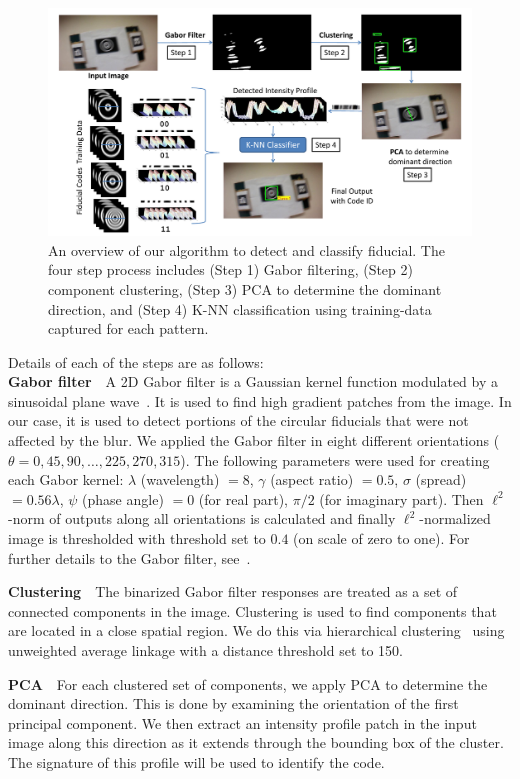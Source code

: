 \documentclass[10pt,twocolumn,letterpaper]{article}
\begin{document}
\begin{figure}[ht!]
\centering
\includegraphics[width=0.8\linewidth]{overall_flow.pdf}
\caption{An overview of our algorithm to detect and classify fiducial.
The four step process includes (Step 1) Gabor filtering,
(Step 2) component clustering, (Step 3) PCA to determine the dominant direction,
and (Step 4) K-NN classification using training-data captured for each pattern.}
\label{fig:overall_flow}
\end{figure}

\noindent Details of each of the steps are as follows:\\
\noindent\textbf{Gabor filter}~~A 2D Gabor filter is a Gaussian kernel function
modulated by a sinusoidal plane wave~\cite{Kruizinga:2002}. It is used to find
high gradient patches from the image. In our case, it is used to detect portions
of the circular fiducials that were not affected by the blur.
We applied the Gabor filter in eight
different orientations ($\theta = 0, 45, 90, \ldots ,225, 270, 315$).  The
following parameters were used for creating each Gabor kernel: $\lambda$ (wavelength) $= 8$, $\gamma$
(aspect ratio) $= 0.5$, $\sigma$ (spread) $= 0.56\lambda$, $\psi$
(phase angle) $= 0$ (for real part), $\pi/2$ (for imaginary part).
Then $\ell^2$-norm of outputs along all orientations is calculated and finally
$\ell^2$-normalized image is thresholded with threshold set to $0.4$ (on scale of zero to
one).  For further details to the Gabor filter, see~\cite{Kruizinga:2002}.

\noindent\textbf{Clustering}~~The binarized Gabor filter responses are
treated as a set of connected components in the image.   Clustering
is used to find components that are located in a close spatial region.  We do
this via hierarchical clustering~\cite{ALGLIB} using unweighted
average linkage with a distance threshold set to 150.

\noindent\textbf{PCA}~~For each clustered set of components, we apply
PCA to determine the dominant direction.  This is done by examining the
orientation of the first principal component.  We then extract an intensity
profile patch in the input image along this direction as it extends through the
bounding box of the cluster. The signature of this profile will be used to
identify the code.
\end{document}
